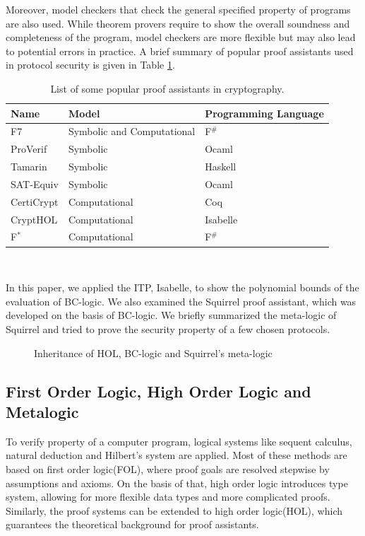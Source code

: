 \documentclass[conference]{IEEEtran}
\begin{document}
Moreover, model checkers that check the general specified property of programs are also used. While theorem provers require to show the overall soundness and completeness of the program, model checkers are more flexible but may also lead to potential errors in practice. A brief summary of popular proof assistants used in protocol security is given in Table \hyperref[table:1]{1}.
\begin{table}[ht]
\centering
\begin{tabular}{ ||p{1.5cm}||p{3cm}|p{2cm}|| }
     \hline
      Name & Model & Programming Language\\
     \hline
     \rowcolor{gray!30}
     F7 & Symbolic and Computational & F$^\#$\\
     ProVerif & Symbolic & Ocaml\\
     \rowcolor{gray!30}
     Tamarin & Symbolic & Haskell\\
     SAT-Equiv & Symbolic & Ocaml \\
     \rowcolor{gray!30}
     CertiCrypt & Computational & Coq\\
     CryptHOL & Computational & Isabelle\\
     \rowcolor{gray!30}
     F$^*$ & Computational & F$^\#$\\
     \hline
\end{tabular}
\\[10pt]
\caption{List of some popular proof assistants in cryptography.}
\label{table:1}
\end{table}
In this paper, we applied the ITP, Isabelle, to show the polynomial bounds of the evaluation of BC-logic. We also examined the Squirrel proof assistant, which was developed on the basis of BC-logic. We briefly summarized the meta-logic of Squirrel and tried to prove the security property of a few chosen protocols.
\begin{figure}
\centering
{}
\caption{Inheritance of HOL, BC-logic and Squirrel's meta-logic}\label{figure:1}
\end{figure}
\subsection{First Order Logic, High Order Logic and Metalogic}
To verify property of a computer program, logical systems like sequent calculus, natural deduction and Hilbert's system are applied. Most of these methods are based on first order logic(FOL), where proof goals are resolved stepwise by assumptions and axioms. On the basis of that, high order logic introduces type system, allowing for more flexible data types and more complicated proofs. Similarly, the proof systems can be extended to high order logic(HOL), which guarantees the theoretical background for proof assistants. \cite{logic1}
\end{document}
